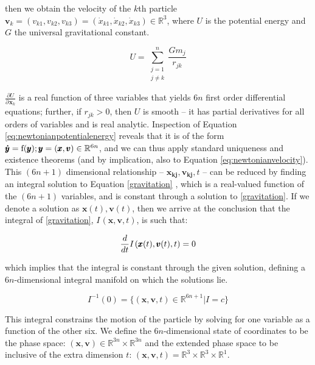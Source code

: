 then we obtain the velocity of the $k$th particle $\pmb{v}_k = (v_{k1}, v_{k2}, v_{k3}) = (\dot{x}_{k1}, \dot{x}_{k2}, \dot{x}_{k3}) \in \mathbb{R}^3$, where $U$ is the potential energy and $G$ the universal gravitational constant.

\begin{equation}\label{eq:newtonianpotentialenergy}
U = \sum_{\substack{j = 1\\ j \neq k}}^n \frac{G m_j}{r_{jk}}
\end{equation}

$\frac{\partial U}{\partial \hspace{1pt} \pmb{x}_k}$ is a real function of three variables that yields $6n$ first order differential equations; further, if $r_{jk} > 0$, then $U$ is smooth -- it has partial derivatives for all orders of variables and is real analytic. Inspection of Equation \ref{eq:newtonianpotentialenergy} reveals that it is of the form $\pmb{\dot{y}} = \textnormal{f}(\pmb{y}); \pmb{y} = (\pmb{x}, \pmb{v}) \in \mathbb{R}^{6n}$, and we can thus apply standard uniqueness and existence theorems (and by implication, also to Equation \ref{eq:newtonianvelocity}). This $(6n + 1)$ dimensional relationship -- $\pmb{x_{kj}}, \pmb{v_{kj}}, t$ -- can be reduced  by finding an integral solution to Equation \ref{gravitation} , which is a real-valued function of the $(6n + 1)$ variables, and is constant through a solution to \ref{gravitation}. If we denote a solution as $\pmb{x}(t), \pmb{v}(t)$, then we arrive at the conclusion that the integral of \ref{gravitation}, $I \hspace{1pt}(\pmb{x, v}, t)$, is such that:

\begin{equation}
\frac{d}{dt} I \hspace{1pt} (\pmb{x}(t), \pmb{v}(t), t) = 0
\end{equation}

which implies that the integral is constant through the given solution, defining a $6n$-dimensional integral manifold on which the solutions lie.

\begin{equation}
I^{-1}(0) = \lbrace (\pmb{x}, \pmb{v}, t) \in \mathbb{R}^{6n+1} \rvert I = c\rbrace
\end{equation}

This integral constrains the motion of the particle by solving for one variable as a function of the other six. We define the $6n$-dimensional state of coordinates to be the phase space: $(\pmb{x}, \pmb{v}) \in \mathbb{R}^{3n} \times \mathbb{R}^{3n}$ and the extended phase space to be inclusive of the extra dimension $t$: $(\pmb{x}, \pmb{v}, t) = \mathbb{R}^3 \times \mathbb{R}^3 \times \mathbb{R}^1$.

